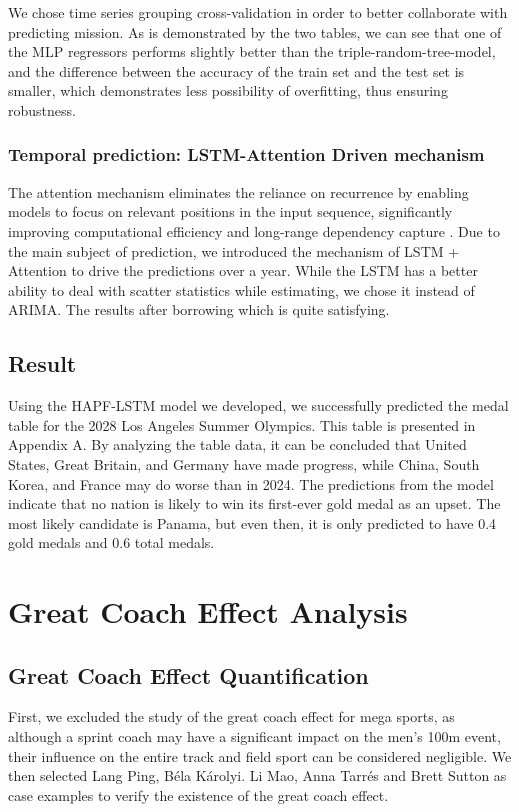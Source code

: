 \documentclass[12pt]{article}
\begin{document}
We chose time series grouping cross-validation in order to better collaborate with predicting mission. As is demonstrated by the two tables, we can see that one of the MLP regressors performs slightly better than the triple-random-tree-model, and the difference between the accuracy of the train set and the test set is smaller, which demonstrates less possibility of overfitting, thus ensuring robustness.

\subsubsection{Temporal prediction: LSTM-Attention Driven mechanism}
\quad \quad The attention mechanism eliminates the reliance on recurrence by enabling models to focus on relevant positions in the input sequence, significantly improving computational efficiency and long-range dependency capture \cite{vaswani2017attention}. Due to the main subject of prediction, we introduced the mechanism of LSTM + Attention to drive the predictions over a year. While the LSTM has a better ability to deal with scatter statistics while estimating, we chose it instead of ARIMA. The results after borrowing which is quite satisfying. 

\subsection{Result}

\quad \quad Using the HAPF-LSTM model we developed, we successfully predicted the medal table for the 2028 Los Angeles Summer Olympics. This table is presented in Appendix A. By analyzing the table data, it can be concluded that United States, Great Britain, and Germany have made progress, while China, South Korea, and France may do worse than in 2024. The predictions from the model indicate that no nation is likely to win its first-ever gold medal as an upset. The most likely candidate is Panama, but even then, it is only predicted to have 0.4 gold medals and 0.6 total medals.

\section{Great Coach Effect Analysis}
\subsection{Great Coach Effect Quantification}

\quad \quad First, we excluded the study of the great coach effect for mega sports, as although a sprint coach may have a significant impact on the men's 100m event, their influence on the entire track and field sport can be considered negligible. We then selected Lang Ping, Béla Károlyi. Li Mao, Anna Tarrés and Brett Sutton as case examples to verify the existence of the great coach effect. \\
\end{document}
